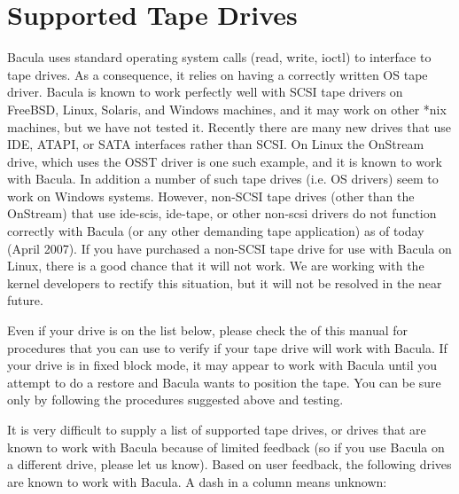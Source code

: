 
\chapter{Supported Tape Drives}
\label{SupportedDrives}

Bacula uses standard operating system calls (read, write, ioctl) to 
interface to tape drives.  As a consequence, it relies on having a
correctly written OS tape driver. Bacula is known to work perfectly well
with SCSI tape drivers on FreeBSD, Linux, Solaris, and Windows machines,
and it may work on other *nix machines, but we have not tested it.
Recently there are many new drives that use IDE, ATAPI, or
SATA interfaces rather than SCSI. On Linux the OnStream drive, which uses
the OSST driver is one such
example, and it is known to work with Bacula. In addition a number of such
tape drives (i.e. OS drivers) seem to work on Windows systems.  However,
non-SCSI tape drives (other than the OnStream) that use ide-scis, ide-tape, 
or other non-scsi drivers do not function correctly with Bacula (or any
other demanding tape application) as of today (April 2007).  If you
have purchased a non-SCSI tape drive for use with Bacula on Linux, there
is a good chance that it will not work. We are working with the kernel
developers to rectify this situation, but it will not be resolved in the 
near future.

Even if your drive is on the list below, please check the 
 of this manual for
procedures that you can use to verify if your tape drive will work with
Bacula. If your drive is in fixed block mode, it may appear to work with
Bacula until you attempt to do a restore and Bacula wants to position the
tape. You can be sure only by following the procedures suggested above and
testing. 

It is very difficult to supply a list of supported tape drives, or drives that
are known to work with Bacula because of limited feedback (so if you use
Bacula on a different drive, please let us know). Based on user feedback, the
following drives are known to work with Bacula. A dash in a column means
unknown: 

